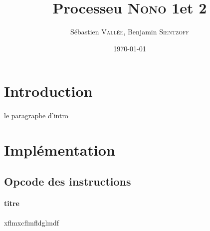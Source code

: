 \documentclass[a4paper]{article}
\title{Processeu \textsc{Nono} 1et 2}
\author{Sébastien \textsc{Vallée}, Benjamin \textsc{Sientzoff}}
\date{\today}
\begin{document}
	\maketitle
	\newpage
	\tableofcontents
	\newpage %
	
	\section*{Introduction}
	\paragraph{}{le paragraphe d'intro}
	
	\section{Implémentation}
	
		\subsection{Opcode des instructions}
			
			\paragraph{titre }{xflmxcflmfldglmdf}
			
\end{document}
